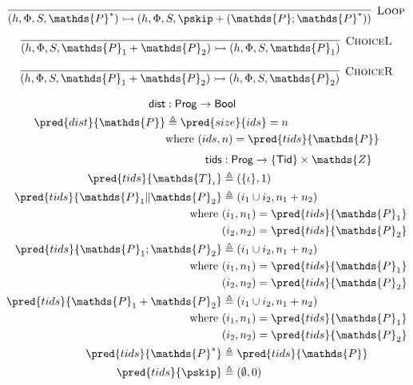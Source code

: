 \[
\infer[\textsc{Loop}]
{
	 (h, \Phi, S, \mathds{P}^*)
	\rightarrowtail
	(h, \Phi, S, \pskip + (\mathds{P} ; \mathds{P}^*))
}
{}
\]

\[
\infer[\textsc{ChoiceL}]
{
	 (h, \Phi, S, \mathds{P}_1 + \mathds{P}_2)
	\rightarrowtail
	(h, \Phi, S, \mathds{P}_1)
}
{}
\]

\[
\infer[\textsc{ChoiceR}]
{
	 (h, \Phi, S, \mathds{P}_1 + \mathds{P}_2)
	\rightarrowtail
	(h, \Phi, S, \mathds{P}_2)
}
{}
\]

\begin{align*}
\mathsf{dist} &: \mathsf{Prog} \rightarrow \mathsf{Bool} \\
\pred{dist}{\mathds{P}} &\triangleq \pred{size}{ids} = n \\
&\text{where } (ids, n) = \pred{tids}{\mathds{P}}
\end{align*}
\begin{align*}
\mathsf{tids} &: \mathsf{Prog} \rightarrow \{\mathsf{Tid}\} \times \mathds{Z} \\
\pred{tids}{\mathds{T}_\iota} &\triangleq (\{ \iota \}, 1) \\
\pred{tids}{\mathds{P}_1 \| \mathds{P}_2} &\triangleq (i_1 \cup i_2, n_1 + n_2) \\
\text{where }& (i_1, n_1) = \pred{tids}{\mathds{P}_1} \\
& (i_2, n_2) = \pred{tids}{\mathds{P}_2} \\
\pred{tids}{\mathds{P}_1 ; \mathds{P}_2} &\triangleq (i_1 \cup i_2, n_1 + n_2) \\
\text{where }& (i_1, n_1) = \pred{tids}{\mathds{P}_1} \\
& (i_2, n_2) = \pred{tids}{\mathds{P}_2} \\
\pred{tids}{\mathds{P}_1 + \mathds{P}_2} &\triangleq (i_1 \cup i_2, n_1 + n_2) \\
\text{where }& (i_1, n_1) = \pred{tids}{\mathds{P}_1} \\
& (i_2, n_2) = \pred{tids}{\mathds{P}_2} \\
\pred{tids}{\mathds{P}^*} &\triangleq \pred{tids}{\mathds{P}} \\
\pred{tids}{\pskip} &\triangleq (\emptyset, 0) \\
\end{align*}
